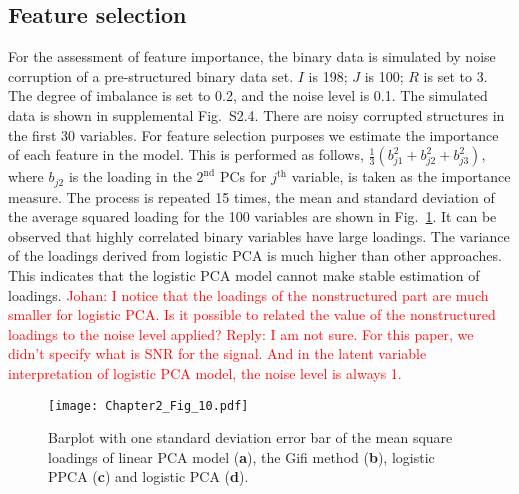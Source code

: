 \subsection{Feature selection}
For the assessment of feature importance, the binary data is simulated by noise corruption of a pre-structured binary data set. $I$ is 198; $J$ is 100; $R$ is set to 3. The degree of imbalance is set to 0.2, and the noise level is 0.1. The simulated data is shown in supplemental Fig.~S2.4. There are noisy corrupted structures in the first 30 variables. For feature selection purposes we estimate the importance of each feature in the model. This is performed as follows, $\frac{1}{3}(b_{j1}^2+b_{j2}^2+ b_{j3}^2)$, where $b_{j2}$ is the loading in the $2^{\text{nd}}$ PCs for $j^{\text{th}}$ variable, is taken as the importance measure. The process is repeated 15 times, the mean and standard deviation of the average squared loading for the 100 variables are shown in Fig.~\ref{chapter2_fig:5}. It can be observed that highly correlated binary variables have large loadings. The variance of the loadings derived from logistic PCA is much higher than other approaches. This indicates that the logistic PCA model cannot make stable estimation of loadings. \textcolor{red}{Johan: I notice that the loadings of the nonstructured part are much smaller for logistic PCA. Is it possible to related the value of the nonstructured loadings to the noise level applied? Reply: I am not sure. For this paper, we didn't specify what is SNR for the signal. And in the latent variable interpretation of logistic PCA model, the noise level is always 1.}
\begin{figure}[htbp]
    \centering
    \texttt{[image: Chapter2\_Fig\_10.pdf]}
    \caption{Barplot with one standard deviation error bar of the mean square loadings of linear PCA model (\textbf{a}), the Gifi method (\textbf{b}), logistic PPCA (\textbf{c}) and logistic PCA (\textbf{d}).}
    \label{chapter2_fig:5}
\end{figure}

